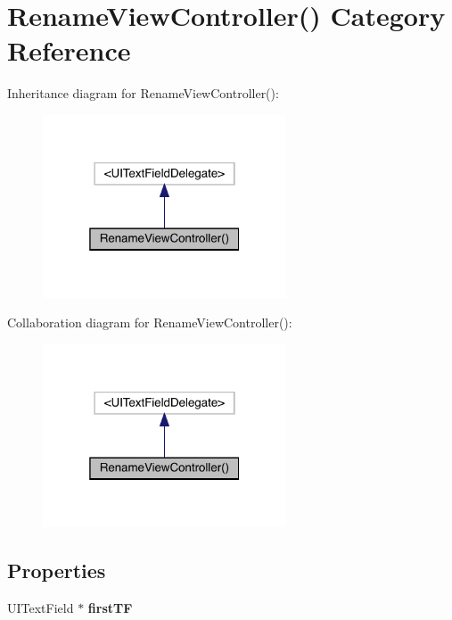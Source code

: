 \hypertarget{category_rename_view_controller_07_08}{}\section{Rename\+View\+Controller() Category Reference}
\label{category_rename_view_controller_07_08}


Inheritance diagram for Rename\+View\+Controller()\+:\nopagebreak
\begin{figure}[H]
\begin{center}
\leavevmode
\includegraphics[width=205pt]{category_rename_view_controller_07_08__inherit__graph}
\end{center}
\end{figure}


Collaboration diagram for Rename\+View\+Controller()\+:\nopagebreak
\begin{figure}[H]
\begin{center}
\leavevmode
\includegraphics[width=205pt]{category_rename_view_controller_07_08__coll__graph}
\end{center}
\end{figure}
\subsection*{Properties}
\begin{DoxyCompactItemize}
\item 
\mbox{\label{category_rename_view_controller_07_08_a139a54ad0b159980cfe9c35375861832}} 
U\+I\+Text\+Field $\ast$ {\bfseries first\+TF}
\end{DoxyCompactItemize}


